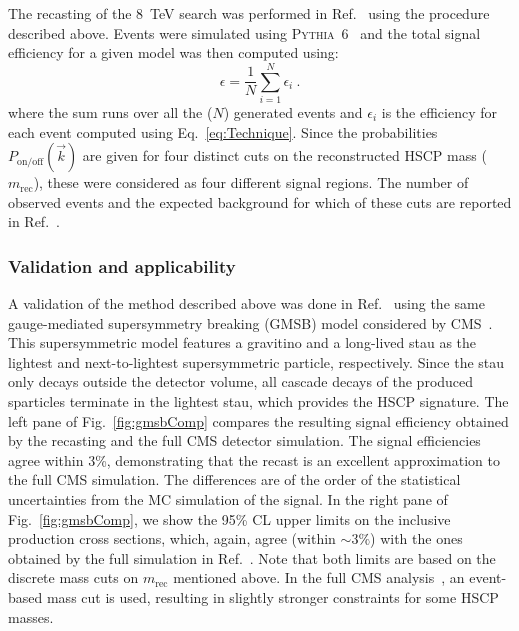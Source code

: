The recasting of the 8~TeV search was performed in Ref.~\cite{Heisig:2015yla}
using the procedure described above.
Events were simulated using \textsc{Pythia}~6~\cite{Sjostrand:2006za} and
the total signal efficiency for a given model was then computed using:
%
\begin{equation*}
\epsilon = \frac{1}{N} \sum_{i=1}^{N} \epsilon_i~.
\end{equation*}
%
where the sum runs over all the ($N$) generated events and $\epsilon_i$ is the
efficiency for each event computed using Eq.~\eqref{eq:Technique}.
Since the probabilities $P_{\text{on/off}}(\vec{k})$ are given for
four distinct cuts on the reconstructed HSCP mass ($m_\text{rec}$),
these were considered as four different signal regions.
The number of observed events and the expected background for which
of these cuts are reported in Ref.~\cite{Khachatryan:2015lla}.

\subsubsection{Validation and applicability}
\label{sec:ch5-validate}

A validation of the method described above was
done in Ref.~\cite{Heisig:2015yla} using the same gauge-mediated supersymmetry
breaking (GMSB) model considered by CMS~\cite{Khachatryan:2015lla}.
This supersymmetric model features a gravitino and a long-lived stau as the lightest and next-to-lightest
supersymmetric particle, respectively.
Since the stau only decays outside the detector volume, all
cascade decays of the produced sparticles terminate in the lightest stau,
which provides the HSCP signature.
The left pane of Fig.~\ref{fig:gmsbComp} compares the
resulting signal efficiency
obtained by the recasting and the full CMS detector
simulation. The signal efficiencies agree within 3\%, demonstrating
that the recast is an excellent approximation to the full CMS simulation. 
The differences are of the order of
the statistical uncertainties from the MC simulation of the signal.
In the right pane of Fig.~\ref{fig:gmsbComp}, we show the 95\% CL upper
limits on the inclusive production cross sections, which, again, agree
(within $\sim 3\%$) with the ones obtained by the full simulation in
Ref.~\cite{Khachatryan:2015lla}.
Note that both limits are based on the discrete mass cuts on $m_\text{rec}$ mentioned
above. In the full CMS analysis~\cite{Chatrchyan:2013oca}, an event-based
mass cut is used, resulting in slightly stronger constraints for some HSCP masses.

